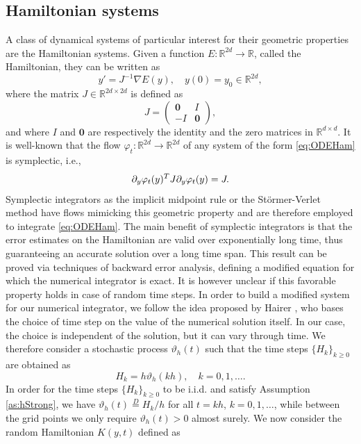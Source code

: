 \documentclass{siamart1116}
\numberwithin{theorem}{section}
\renewcommand{\phi}{\varphi}
\renewcommand{\theta}{\vartheta}
\newcommand{\eqtext}[1]{\ensuremath{\stackrel{#1}{=}}}
\newcommand{\pdv}[2]{\ensuremath\partial_{#2}#1}
\newcommand{\R}{\mathbb{R}}
\begin{document}
\subsection{Hamiltonian systems} A class of dynamical systems of particular interest for their geometric properties are the Hamiltonian systems. Given a function $E\colon \R^{2d}\to\R$, called the Hamiltonian, they can be written as
\begin{equation}\label{eq:ODEHam}
	y' = J^{-1}\nabla E(y), \quad y(0) = y_0 \in \R^{2d},
\end{equation}
where the matrix $J\in\R^{2d \times 2d}$ is defined as
\begin{equation}
	J = \begin{pmatrix} \mathbf{0} & I \\ -I & \mathbf{0} \end{pmatrix},
\end{equation}
and where $I$ and $\mathbf{0}$ are respectively the identity and the zero matrices in $\R^{d\times d}$. It is well-known that the flow $\phi_t\colon\R^{2d}\to\R^{2d}$ of any system of the form \eqref{eq:ODEHam} is symplectic, i.e., 
\begin{equation}\label{eq:SymplecticSystem}
	\pdv{\phi_t(y)}{y}^T J \pdv{\phi_t(y)}{y} = J.
\end{equation}
Symplectic integrators as the implicit midpoint rule or the Störmer-Verlet method have flows mimicking this geometric property and are therefore employed to integrate \eqref{eq:ODEHam}. The main benefit of symplectic integrators is that the error estimates on the Hamiltonian are valid over exponentially long time, thus guaranteeing an accurate solution over a long time span. This result can be proved via techniques of backward error analysis, defining a modified equation for which the numerical integrator is exact. It is however unclear if this favorable property holds in case of random time steps. In order to build a modified system for our numerical integrator, we follow the idea proposed by Hairer \cite{Hai97}, who bases the choice of time step on the value of the numerical solution itself. In our case, the choice is independent of the solution, but it can vary through time. We therefore consider a stochastic process $\theta_h(t)$ such that the time steps $\{H_k\}_{k\geq 0}$ are obtained as
\begin{equation}
	H_k = h\theta_h(kh), \quad k = 0, 1, \ldots.
\end{equation}
In order for the time steps $\{H_k\}_{k \geq 0}$ to be i.i.d. and satisfy Assumption \ref{as:hStrong}, we have $\theta_h(t) \eqtext{D} H_k / h$ for all $t = kh$, $k = 0, 1, \ldots$, while between the grid points we only require $\theta_h(t) > 0$ almost surely. We now consider the random Hamiltonian $K(y, t)$ defined as
\end{document}
